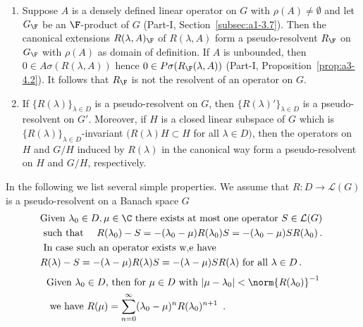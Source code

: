 \begin{example}\label{ex:c3-2.5}
	\begin{enumerate}[\upshape (i), wide, labelindent=.25em]
		\item 
		Suppose $A$ is a densely defined linear operator on $G$ with $\rho(A) \neq \emptyset$ and let $G_{\F}$ be an $\F$-product of\/ $G$ (\cf Part-I, Section~\ref{subsec:a1-3.7}).
		Then the canonical extensions $R(\lambda,A)_{\F}$ of\/ $R(\lambda,A)$ form a pseudo-resolvent $R_{\F}$ on $G_{\F}$ with $\rho(A)$ as domain of definition.
		If\/ $A$ is unbounded, then $0 \in A\sigma(R(\lambda,A))$ hence $0 \in P\sigma(R_{\F}(\lambda,A))$ (\cf Part-I, Proposition~\ref{prop:a3-4.2}).
		It follows that $R_{\F}$ is not the resolvent of an operator on $G$.
		
		\item 
		If\/ $\{R(\lambda)\}_{\lambda\in D}$ is a pseudo-resolvent on $G$, then $\{R(\lambda)'\}_{\lambda\in D}$ is a pseudo-resolvent on $G'$.
		Moreover, if\/ $H$ is a closed linear subspace of\/ $G$ which is $\{R(\lambda)\}_{\lambda\in D}$-invariant $(R(\lambda)H \subset H$ for all $\lambda \in D)$, then the operators on $H$ and $G/H$ induced by $R(\lambda)$ in the canonical way form a pseudo-resolvent on $H$ and $G/H$, respectively.
	\end{enumerate}
\end{example}
In the following we list several simple properties.
We assume that $R \colon D \to \mathcal{L}(G)$ is a pseudo-resolvent on a Banach space $G$
\begin{equation}\label{eq:c3-2.10}
	\begin{split}
	&\text{Given  $\lambda_{0} \in D, \mu \in \C $  there exists at most one operator  $S \in \mathcal{L}(G)$ }\\
	&\text{ such that \quad $R(\lambda_{0}) - S = -(\lambda_{0}-\mu)R(\lambda_{0})S = -(\lambda_{0}-\mu)SR(\lambda_{0})$}\,.\\
	&\text{ In case such an operator exists w,e have} \\
	&\text{$R(\lambda) - S = -(\lambda-\mu)R(\lambda)S = -(\lambda-\mu)SR(\lambda)$ for all $\lambda \in D$}\,.
	\end{split}
\end{equation}
\begin{equation}\label{eq:c3-2.11}
	\begin{split}
	&\text{Given  $\lambda_{0} \in D$,  then for  $\mu \in D$  with  $|\mu-\lambda_{0}| < \norm{R(\lambda_{0})}^{-1}$}\\ 
	&\text{ we have $ R(\mu) = \sum_{n=0}^{\infty} (\lambda_{0}-\mu)^n R(\lambda_{0})^{n+1}$ }\,.
	\end{split}
\end{equation}
